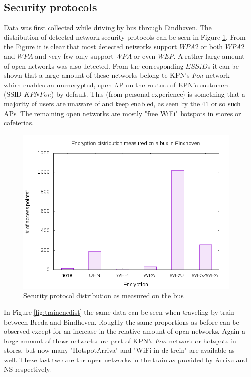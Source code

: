\documentclass[letterpaper, 10 pt, conference]{ieeeconf}  %
\begin{document}
\subsection{Security protocols}
Data was first collected while driving by bus through Eindhoven. The distribution of detected network security protocols can be seen in Figure \ref{fig:busencdist}. From the Figure it is clear that most detected networks support $WPA2$ or both $WPA2$ and $WPA$ and very few only support $WPA$ or even $WEP$. A rather large amount of open networks was also detected. From the corresponding $ESSID$s it can be shown that a large amount of these networks belong to KPN's $Fon$ network which enables an unencrypted, open AP on the routers of KPN's customers (SSID $KPN Fon$) by default. This (from personal experience) is something that a majority of users are unaware of and keep enabled, as seen by the $41$ or so such APs. The remaining open networks are mostly "free WiFi" hotspots in stores or cafeterias. 

\begin{figure}[h]
\includegraphics[scale=0.5]{Figures/BusEncryptionCount.png}
\caption{Security protocol distribution as measured on the bus}
\label{fig:busencdist}
\end{figure}

In Figure \ref{fig:trainencdist} the same data can be seen when traveling by train between Breda and Eindhoven. Roughly the same proportions as before can be observed except for an increase in the relative amount of open networks. Again a large amount of those networks are part of KPN's $Fon$ network or hotspots in stores, but now many "HotspotArriva" and "WiFi in de trein" are available as well. These last two are the open networks in the train as provided by Arriva and NS respectively.
\end{document}

